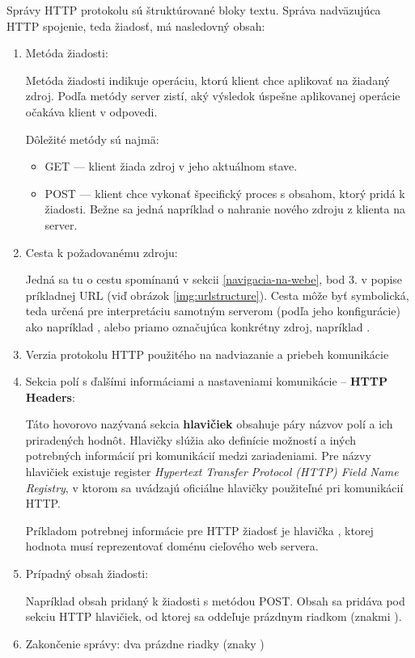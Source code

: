 Správy HTTP protokolu sú štruktúrované bloky textu.
Správa nadväzujúca HTTP spojenie, teda žiadosť, má nasledovný obsah:
\begin{enumerate}
    \item Metóda žiadosti:

    Metóda žiadosti indikuje operáciu, ktorú klient chce aplikovať na žiadaný zdroj.
    Podľa metódy server zistí, aký výsledok úspešne aplikovanej operácie očakáva klient v odpovedi.

    Dôležité metódy sú najmä:
    \begin{itemize}
        \item GET --- klient žiada zdroj v jeho aktuálnom stave. 
        \item POST --- klient chce vykonať špecifický proces s obsahom, ktorý pridá k žiadosti. 
        Bežne sa jedná napríklad o nahranie nového zdroju z klienta na server.
    \end{itemize}
    
    \item Cesta k požadovanému zdroju:

    Jedná sa tu o cestu spomínanú v sekcii \ref{navigacia-na-webe}, bod 3. v popise príkladnej URL (viď obrázok \ref{img:urlstructure}).
    Cesta môže byť symbolická, teda určená pre interpretáciu samotným serverom (podľa jeho konfigurácie) ako napríklad , alebo priamo označujúca konkrétny zdroj, napríklad .  
 
    \item Verzia protokolu HTTP použitého na nadviazanie a priebeh komunikácie
    
    \item Sekcia polí s ďalšími informáciami a nastaveniami komunikácie -- \textbf{HTTP Headers}:
    
    Táto hovorovo nazývaná sekcia \textbf{hlavičiek} obsahuje páry názvov polí a ich priradených hodnôt. 
    Hlavičky slúžia ako definície možností a iných potrebných informácií pri komunikácií medzi zariadeniami.
    Pre názvy hlavičiek existuje register \textit{Hypertext Transfer Protocol (HTTP) Field Name Registry},
    v ktorom sa uvádzajú oficiálne hlavičky použiteľné pri komunikácií HTTP. 

    Príkladom potrebnej informácie pre HTTP žiadosť je hlavička , ktorej hodnota musí reprezentovať doménu cieľového web servera. 
    
    \item Prípadný obsah žiadosti:

    Napríklad obsah pridaný k žiadosti s metódou POST. 
    Obsah sa pridáva pod sekciu HTTP hlavičiek, od ktorej sa oddeľuje prázdnym riadkom (znakmi ).

    \item Zakončenie správy: dva prázdne riadky (znaky )

\end{enumerate}



